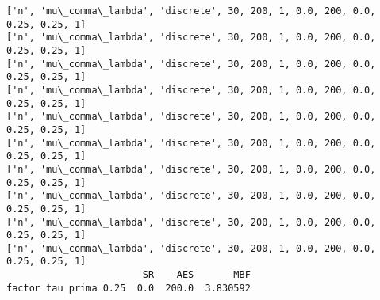 \documentclass[11pt]{article}
\begin{document}
\begin{Verbatim}[commandchars=\\\{\}]
['n', 'mu\_comma\_lambda', 'discrete', 30, 200, 1, 0.0, 200, 0.0, 0.25, 0.25, 1]
['n', 'mu\_comma\_lambda', 'discrete', 30, 200, 1, 0.0, 200, 0.0, 0.25, 0.25, 1]
['n', 'mu\_comma\_lambda', 'discrete', 30, 200, 1, 0.0, 200, 0.0, 0.25, 0.25, 1]
['n', 'mu\_comma\_lambda', 'discrete', 30, 200, 1, 0.0, 200, 0.0, 0.25, 0.25, 1]
['n', 'mu\_comma\_lambda', 'discrete', 30, 200, 1, 0.0, 200, 0.0, 0.25, 0.25, 1]
['n', 'mu\_comma\_lambda', 'discrete', 30, 200, 1, 0.0, 200, 0.0, 0.25, 0.25, 1]
['n', 'mu\_comma\_lambda', 'discrete', 30, 200, 1, 0.0, 200, 0.0, 0.25, 0.25, 1]
['n', 'mu\_comma\_lambda', 'discrete', 30, 200, 1, 0.0, 200, 0.0, 0.25, 0.25, 1]
['n', 'mu\_comma\_lambda', 'discrete', 30, 200, 1, 0.0, 200, 0.0, 0.25, 0.25, 1]
['n', 'mu\_comma\_lambda', 'discrete', 30, 200, 1, 0.0, 200, 0.0, 0.25, 0.25, 1]
                        SR    AES       MBF
factor tau prima 0.25  0.0  200.0  3.830592

    \end{Verbatim}
\end{document}
